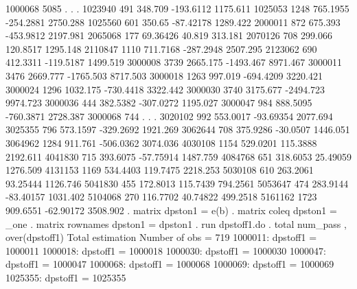      1000068 {\VBAR}       5085          .             .           .
     1023940 {\VBAR}        491    348.709     -193.6112    1175.611
     1025053 {\VBAR}       1248   765.1955     -254.2881    2750.288
     1025560 {\VBAR}        601     350.65     -87.42178    1289.422
     2000011 {\VBAR}        872    675.393     -453.9812    2197.981
     2065068 {\VBAR}        177   69.36426        40.819     313.181
     2070126 {\VBAR}        708    299.066      120.8517    1295.148
     2110847 {\VBAR}       1110   711.7168     -287.2948    2507.295
     2123062 {\VBAR}        690   412.3311     -119.5187    1499.519
     3000008 {\VBAR}       3739   2665.175     -1493.467    8971.467
     3000011 {\VBAR}       3476   2669.777     -1765.503    8717.503
     3000018 {\VBAR}       1263    997.019     -694.4209    3220.421
     3000024 {\VBAR}       1296   1032.175     -730.4418    3322.442
     3000030 {\VBAR}       3740   3175.677     -2494.723    9974.723
     3000036 {\VBAR}        444   382.5382     -307.0272    1195.027
     3000047 {\VBAR}        984   888.5095     -760.3871    2728.387
     3000068 {\VBAR}        744          .             .           .
     3020102 {\VBAR}        992   553.0017     -93.69354    2077.694
     3025355 {\VBAR}        796   573.1597     -329.2692    1921.269
     3062644 {\VBAR}        708   375.9286      -30.0507    1446.051
     3064962 {\VBAR}       1284    911.761     -506.0362    3074.036
     4030108 {\VBAR}       1154   529.0201      115.3888    2192.611
     4041830 {\VBAR}        715   393.6075     -57.75914    1487.759
     4084768 {\VBAR}        651   318.6053      25.49059    1276.509
     4131153 {\VBAR}       1169   534.4403      119.7475    2218.253
     5030108 {\VBAR}        610   263.2061      93.25444    1126.746
     5041830 {\VBAR}        455   172.8013      115.7439    794.2561
     5053647 {\VBAR}        474   283.9144     -83.40157    1031.402
     5104068 {\VBAR}        270   116.7702      40.74822    499.2518
     5161162 {\VBAR}       1723   909.6551     -62.90172    3508.902
{\smallskip}
. matrix dpston1 = e(b)
{\smallskip}
. matrix coleq dpston1 = _one
{\smallskip}
. matrix rownames dpston1 = dpston1
{\smallskip}
. run dpstoff1.do
{\smallskip}
. total num_pass , over(dpstoff1)
{\smallskip}
Total estimation                  Number of obs   =        719
{\smallskip}
      1000011: dpstoff1 = 1000011
      1000018: dpstoff1 = 1000018
      1000030: dpstoff1 = 1000030
      1000047: dpstoff1 = 1000047
      1000068: dpstoff1 = 1000068
      1000069: dpstoff1 = 1000069
      1025355: dpstoff1 = 1025355
